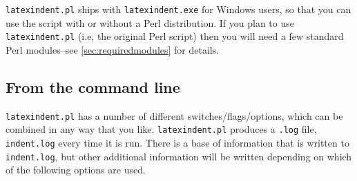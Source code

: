 \documentclass[11pt]{article}
\begin{document}
\lstinline!latexindent.pl! ships with \lstinline!latexindent.exe! for Windows
users, so that you can use the script with or without a Perl distribution.
If you plan to use \lstinline!latexindent.pl! (i.e, the original Perl script) then you will
need a few standard Perl modules--see \vref{sec:requiredmodules} for details.

\subsection{From the command line}\label{sec:commandline}
\lstinline!latexindent.pl! has a number of different switches/flags/options, which
can be combined in any way that you like. \lstinline!latexindent.pl!
produces a \lstinline!.log! file, \lstinline!indent.log! every time it
is run. There is a base of information that is written to \lstinline!indent.log!,
but other additional information will be written depending
on which of the following options are used.
\end{document}

